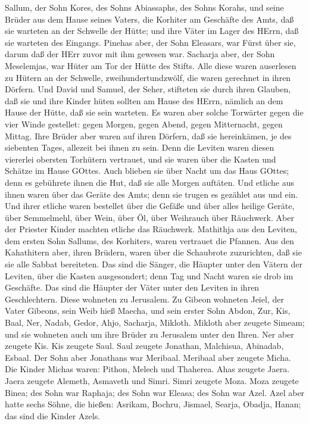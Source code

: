Sallum, der Sohn Kores, des Sohns Abiassaphs, des Sohns Korahs, und
seine Brüder aus dem Hause seines Vaters, die Korhiter am Geschäfte des
Amts, daß sie warteten an der Schwelle der Hütte; und ihre Väter im
Lager des HErrn, daß sie warteten des Eingangs.  Pinehas
aber, der Sohn Eleasars, war Fürst über sie, darum daß der HErr zuvor
mit ihm gewesen war.  Sacharja aber, der Sohn Meselemjas,
war Hüter am Tor der Hütte des Stifts.  Alle diese waren
auserlesen zu Hütern an der Schwelle, zweihundertundzwölf, die waren
gerechnet in ihren Dörfern. Und David und Samuel, der Seher, stifteten
sie durch ihren Glauben,  daß sie und ihre Kinder hüten
sollten am Hause des HErrn, nämlich an dem Hause der Hütte, daß sie sein
warteten.  Es waren aber solche Torwärter gegen die vier
Winde gestellet: gegen Morgen, gegen Abend, gegen Mitternacht, gegen
Mittag.  Ihre Brüder aber waren auf ihren Dörfern, daß sie
hereinkämen, je des siebenten Tages, allezeit bei ihnen zu sein.
 Denn die Leviten waren diesen viererlei obersten Torhütern
vertrauet, und sie waren über die Kasten und Schätze im Hause GOttes.
 Auch blieben sie über Nacht um das Haus GOttes; denn es
gebührete ihnen die Hut, daß sie alle Morgen auftäten.  Und
etliche aus ihnen waren über das Geräte des Amts; denn sie trugen es
gezählet aus und ein.  Und ihrer etliche waren bestellet
über die Gefäße und über alles heilige Geräte, über Semmelmehl, über
Wein, über Öl, über Weihrauch über Räuchwerk.  Aber der
Priester Kinder machten etliche das Räuchwerk.  Mathithja
aus den Leviten, dem ersten Sohn Sallums, des Korhiters, waren vertrauet
die Pfannen.  Aus den Kahathitern aber, ihren Brüdern,
waren über die Schaubrote zuzurichten, daß sie sie alle Sabbat
bereiteten.  Das sind die Sänger, die Häupter unter den
Vätern der Leviten, über die Kasten ausgesondert; denn Tag und Nacht
waren sie drob im Geschäfte.  Das sind die Häupter der
Väter unter den Leviten in ihren Geschlechtern. Diese wohneten zu
Jerusalem.  Zu Gibeon wohneten Jeiel, der Vater Gibeons,
sein Weib hieß Maecha,  und sein erster Sohn Abdon, Zur,
Kis, Baal, Ner, Nadab,  Gedor, Ahjo, Sacharja, Mikloth.
 Mikloth aber zeugete Simeam; und sie wohneten auch um ihre
Brüder zu Jerusalem unter den Ihren.  Ner aber zeugete Kis.
Kis zeugete Saul. Saul zeugete Jonathan, Malchisua, Abinadab, Esbaal.
 Der Sohn aber Jonathans war Meribaal. Meribaal aber
zeugete Micha.  Die Kinder Michas waren: Pithon, Melech und
Thaherea.  Ahas zeugete Jaera. Jaera zeugete Alemeth,
Asmaveth und Simri. Simri zeugete Moza.  Moza zeugete
Binea; des Sohn war Raphaja; des Sohn war Eleasa; des Sohn war Azel.
 Azel aber hatte sechs Söhne, die hießen: Asrikam, Bochru,
Jismael, Searja, Obadja, Hanan; das sind die Kinder Azels.

